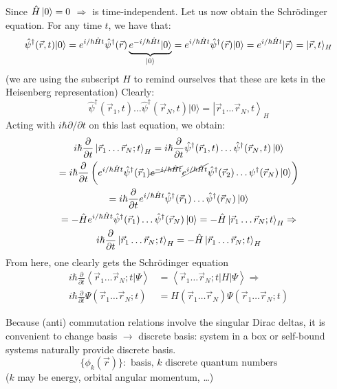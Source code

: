 \documentclass[12pt]{article}
\newcommand{\be}{\begin{equation}}
\newcommand{\ee}{\end{equation}}
\begin{document}
Since $\hat{H}\ket{0}=0$ $\Rightarrow$ is time-independent.
Let us now obtain the Schrödinger equation. For any
time $t$, we have that:
\be
\hat{\psi}^\dagger(\vec{r}, t)|0\rangle=
e^{i / \hbar \hat{H} t} \hat{\psi}^\dagger(\vec{r})
\underbrace{e^{-i / \hbar \hat{H} t} | 0\rangle}_{\ket{0}}  =
e^{i / \hbar \hat{H} t} \hat{\psi}^\dagger(\vec{r})| 0\rangle = 
e^{i / \hbar \hat{H} t}|\vec{r}\rangle=|\vec{r}, t\rangle_{H}
\ee
(we are using the subscript $H$ to remind ourselves that these are kets in the Heisenberg representation)
Clearly:
\be
\hat{\psi}^{\dagger}\left(\vec{r}_{1}, t\right) \ldots 
\hat{\psi}^{\dagger}\left(\vec{r}_{N}, t\right)|0\rangle=
\left|\vec{r}_{1} \ldots \vec{r}_{N}, t\right\rangle_H
\ee
Acting with $i\hbar \partial/\partial t$ on this last equation, we obtain:
\be
\begin{gathered}
i\hbar \frac{\partial}{\partial t} \ket{\vec{r}_{1} \ldots \vec{r}_{N}; t}_H = 
i\hbar \frac{\partial}{\partial t}
\hat{\psi}^\dagger(\vec{r}_1, t)\ldots\hat{\psi}^\dagger(\vec{r}_N, t)\ket{0}\\
= i\hbar \frac{\partial}{\partial t}
\left(
e^{i / \hbar \hat{H} t} \hat{\psi}^\dagger(\vec{r}_1) 
  \cancel{e^{-i / \hbar \hat{H} t}} \cancel{e^{i / \hbar \hat{H} t}} \hat{\psi}^\dagger(\vec{r}_2)\ldots\psi^\dagger(\vec{r}_N)\ket{0}\right)\\
= i\hbar \frac{\partial}{\partial t} 
e^{i / \hbar \hat{H} t} 
\hat{\psi}^\dagger(\vec{r}_1)\ldots\hat{\psi}^\dagger(\vec{r}_N)\ket{0}\\
=-\hat{H} e^{i / \hbar \hat{H} t} \hat{\psi}^\dagger(\vec{r}_1)\ldots\hat{\psi}^\dagger(\vec{r}_N)\ket{0} = 
-\hat{H} \ket{\vec{r}_1\ldots\vec{r}_N;t}_H \Rightarrow\\
i\hbar \frac{\partial}{\partial t} \ket{\vec{r}_{1} \ldots \vec{r}_{N}; t}_H = -\hat{H} \ket{\vec{r}_1\ldots\vec{r}_N;t}_H
\end{gathered}
\ee
From here, one clearly gets the Schrödinger equation
\be
\begin{aligned}
i \hbar \frac{\partial}{\partial t}\left\langle\vec{r}_{1} \ldots \vec{r}_{N} ; t | \Psi\right\rangle
&=\left\langle\vec{r}_{1} \ldots \vec{r}_{N} ; t|H| \Psi\right\rangle\Rightarrow\\
i \hbar \frac{\partial}{\partial t} \Psi(\vec{r}_{1} \ldots \vec{r}_{N} ; t)
&=H(\vec{r}_{1} \ldots \vec{r}_{N}) \Psi(\vec{r}_{1} \ldots \vec{r}_{N} ; t)
\end{aligned} 
\ee

Because (anti) commutation relations involve the
singular Dirac deltas, it is convenient to change basis
$\rightarrow$ discrete basis: system in a box or self-bound systems
naturally provide discrete basis.
\be
\{\phi_k(\vec{r})\}:\text{ basis, $k$ discrete quantum numbers}
\ee
($k$ may be energy, orbital angular momentum, \ldots)
\end{document}
